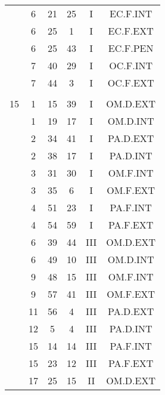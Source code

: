 \documentclass[12pt, a4paper]{article}
\begin{document}
\begin{multicols}{3}
{\begin{tabular}{c c c c c c}
	 	 	 	 & 6 & 21 & 25 & I & EC.F.INT\\%
	 	 	 	 & 6 & 25 & 1 & I & EC.F.EXT\\%
	 	 	 	 & 6 & 25 & 43 & I & EC.F.PEN\\%
	 	 	 	 & 7 & 40 & 29 & I & OC.F.INT\\%
	 	 	 	 & 7 & 44 & 3 & I & OC.F.EXT\\%
	 	 	 	 & & & & & \\%
	 	 	 	15 & 1 & 15 & 39 & I & OM.D.EXT\\%
	 	 	 	 & 1 & 19 & 17 & I & OM.D.INT\\%
	 	 	 	 & 2 & 34 & 41 & I & PA.D.EXT\\%
	 	 	 	 & 2 & 38 & 17 & I & PA.D.INT\\%
	 	 	 	 & 3 & 31 & 30 & I & OM.F.INT\\%
	 	 	 	 & 3 & 35 & 6 & I & OM.F.EXT\\%
	 	 	 	 & 4 & 51 & 23 & I & PA.F.INT\\%
	 	 	 	 & 4 & 54 & 59 & I & PA.F.EXT\\%
	 	 	 	 & 6 & 39 & 44 & III & OM.D.EXT\\%
	 	 	 	 & 6 & 49 & 10 & III & OM.D.INT\\%
	 	 	 	 & 9 & 48 & 15 & III & OM.F.INT\\%
	 	 	 	 & 9 & 57 & 41 & III & OM.F.EXT\\%
	 	 	 	 & 11 & 56 & 4 & III & PA.D.EXT\\%
	 	 	 	 & 12 & 5 & 4 & III & PA.D.INT\\%
	 	 	 	 & 15 & 14 & 14 & III & PA.F.INT\\%
	 	 	 	 & 15 & 23 & 12 & III & PA.F.EXT\\%
	 	 	 	 & 17 & 25 & 15 & II & OM.D.EXT\\%

\end{tabular}}
\end{multicols}
\end{document}
